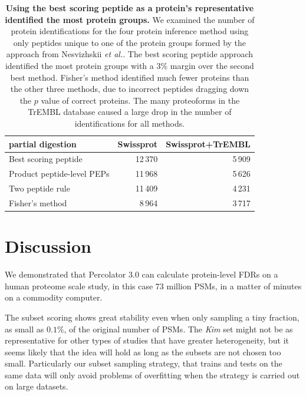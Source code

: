 \documentclass{article}
\begin{document}
\begin{table}[!htp]
  \begin{center}
    \begin{tabular}{|l|r|r|}
    \hline
    partial digestion & Swissprot & Swissprot+TrEMBL\\
    \hline
    Best scoring peptide & 12\,370 & 5\,909\\
    \hline
    Product peptide-level PEPs & 11\,968 & 5\,626\\
    \hline
    Two peptide rule & 11\,409 & 4\,231\\
    \hline
    Fisher's method & 8\,964 & 3\,717\\
    \hline
    \end{tabular}
  \end{center}
  \caption{\label{tab:pandey-stats}\textbf{Using the best scoring
peptide as a protein's representative identified the most protein
groups.} We examined the number of protein identifications for the
four protein inference method using only peptides unique to one of
the protein groups formed by the approach from Nesvizhskii {\em et
al.}. The best scoring peptide approach identified the most protein
groups with a $3\%$ margin over the second best method. Fisher's
method identified much fewer proteins than the other three methods,
due to incorrect peptides dragging down the $p$ value of correct
proteins. The many proteoforms in the TrEMBL database caused a large
drop in the number of identifications for all methods.}
\end{table}

\section*{Discussion}

We demonstrated that Percolator 3.0 can calculate protein-level FDRs
on a human proteome scale study, in this case $73$ million PSMs, in a
matter of minutes on a commodity computer.

The subset scoring shows great stability even when only sampling a
tiny fraction, as small as $0.1\%$, of the original number of PSMs.
The {\em Kim} set might not be as representative for other types of
studies that have greater heterogeneity, but it seems likely that the
idea will hold as long as the subsets are not chosen too small.
Particularly our subset sampling strategy, that trains and tests on
the same data will only avoid problems of overfitting when the
strategy is carried out on large datasets.
\end{document}
